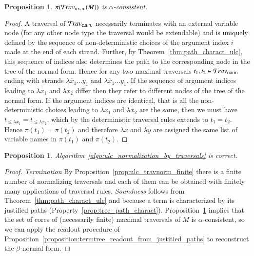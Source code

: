\documentclass{elsarticle}
\theoremstyle{plain}
\newtheorem{proposition}[theorem]{Proposition}
\theoremstyle{definition}
\newcommand{\normalizing}{{\sf norm}}
\newcommand{\travsetnorm}{\travset_\normalizing} %
\newcommand{\travsetscn}{\travset_{\sf c.s.n.}} %
\def\coresymbol{\pi} %
\newcommand{\core}[1]{\coresymbol(#1)} %
\begin{document}
\begin{proposition}
    \label{prop:core_travsetnorm_alpha_consistent}
    $\core{\travsetscn(M)}$ is $\alpha$-consistent.
\end{proposition}
\begin{proof}
A traversal of $\travsetscn$
necessarily terminates with an external variable node (for any other node type the traversal would be extendable) and
is uniquely defined by the sequence of non-deterministic choices of the argument index $i$ made at the end of each strand. Further, by Theorem~\ref{thm:path_charact_ulc}, this sequence of indices also determines the path to the corresponding node in the tree of the normal form.
Hence for any two maximal traversals $t_1,t_2 \in \travsetnorm$
ending with strands $\lambda\overline{x}_1 \ldots y_1$ and
$\lambda\overline{x}_1 \ldots y_1$.
If the sequence of argument indices leading to $\lambda\overline{x}_1$ and $\lambda\overline{x}_2$ differ then they refer to different nodes of the tree of the normal form.
If the argument indices are identical, that is all the non-deterministic choices leading to $\lambda\overline{x}_1$ and $\lambda\overline{x}_2$ are the same, then we must have $t_{\leq \lambda\overline{x}_1} = t_{\leq \lambda\overline{x}_2}$, which by the deterministic
traversal rules extends to $t_1 = t_2$.
Hence $\core{t_1} = \core{t_2}$ and therefore $\lambda\overline{x}$
and $\lambda\overline{y}$ are assigned the same list of variable names in
$\core{t_1}$ and $\core{t_2}$.
\end{proof}

\begin{proposition}
    Algorithm~\ref{algo:ulc_normalization_by_traversals} is correct.
\end{proposition}
\begin{proof}
\emph{Termination}  By Proposition~\ref{prop:ulc_travnorm_finite} there is a finite number of normalizing traversals and each of them can be obtained with finitely many applications of traversal rules.
%
\emph{Soundness} follows from Theorem~\ref{thm:path_charact_ulc} and because a term is  characterized by its justified paths (Property~\ref{prop:tree_path_charact}).
Proposition~\ref{prop:core_travsetnorm_alpha_consistent}
implies that
the set of cores of (necessarily finite) maximal traversals of $M$
is $\alpha$-consistent, so we can
apply the readout procedure of Proposition~\ref{proposition:termtree_readout_from_justitied_paths} to
reconstruct the $\beta$-normal form.
\end{proof}
\end{document}
